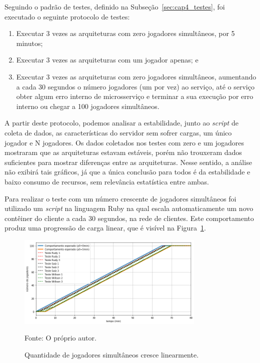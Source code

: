 Seguindo o padrão de testes, definido na Subseção~\ref{sec:cap4_testes}, foi executado o seguinte protocolo de testes:

\begin{enumerate}
  \item Executar 3 vezes as arquiteturas com zero jogadores simultâneos, por 5 minutos;
  \item Executar 3 vezes as arquiteturas com um jogador apenas; e
  \item Executar 3 vezes as arquiteturas com zero jogadores simultâneos, aumentando a cada 30 segundos o número jogadores (um por vez) ao serviço, até o serviço obter algum erro interno de microsserviço e terminar a sua execução por erro interno ou chegar a 100 jogadores simultâneos.
\end{enumerate}

A partir deste protocolo, podemos analisar a estabilidade, junto ao \textit{script} de coleta de dados, as características do servidor sem sofrer cargas, um único jogador e N jogadores.
%
Os dados coletados nos testes com zero e um jogadores mostraram que as arquiteturas estavam estáveis, porém não trouxeram dados suficientes para mostrar diferenças entre as arquiteturas.
%
Nesse sentido, a análise não exibirá tais gráficos, já que a única conclusão para todos é da estabilidade e baixo consumo de recursos, sem relevância estatística entre ambas.

Para realizar o teste com um número crescente de jogadores simultâneos foi utilizado um \textit{script} na linguagem Ruby na qual escala automaticamente um novo contêiner do cliente a cada 30 segundos, na rede de clientes.
%
Este comportamento produz uma progressão de carga linear, que é visível na Figura~\ref{fig:cliente_linear}.
\pagebreak
\begin{figure}[htb!]
  \caption{Quantidade de jogadores simultâneos cresce linearmente.}
  \label{fig:cliente_linear}
  \includegraphics[width=0.8\textwidth]{figuras/network/clientes_script.png}
  \centering

  Fonte: O próprio autor.
\end{figure}

